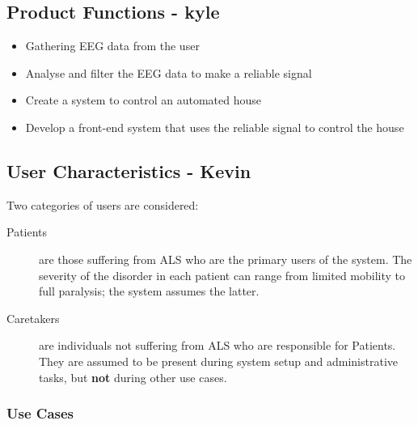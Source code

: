 \documentclass{article}
\begin{document}
\subsection{Product Functions - kyle}
\begin{itemize}
\item Gathering EEG data from the user
\item Analyse and filter the EEG data to make a reliable signal
\item Create a system to control an automated house
\item Develop a front-end system that uses the reliable signal to control the house

\end{itemize}

\subsection{User Characteristics - Kevin}

Two categories of users are considered:

\begin{description}
    \item[Patients] are those suffering from ALS who are the primary users of
        the system. The severity of the disorder in each patient can range
        from limited mobility to full paralysis; the system assumes the
        latter.
    \item[Caretakers] are individuals not suffering from ALS who are
        responsible for Patients. They are assumed to be present during system
        setup and administrative tasks, but \textbf{not} during other use
        cases.
\end{description}

\subsubsection{Use Cases}
\end{document}
